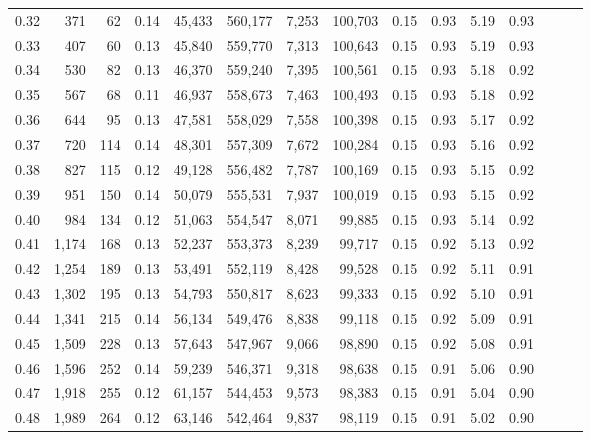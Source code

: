 \begin{tabular}{rrrrrrrrrrrrrrr}
0.32 &     371 &      62 &  0.14 &   45,433 &  560,177 &    7,253 &  100,703 &  0.15 &  0.93 &  5.19 &      0.93 \\
0.33 &     407 &      60 &  0.13 &   45,840 &  559,770 &    7,313 &  100,643 &  0.15 &  0.93 &  5.19 &      0.93 \\
0.34 &     530 &      82 &  0.13 &   46,370 &  559,240 &    7,395 &  100,561 &  0.15 &  0.93 &  5.18 &      0.92 \\
0.35 &     567 &      68 &  0.11 &   46,937 &  558,673 &    7,463 &  100,493 &  0.15 &  0.93 &  5.18 &      0.92 \\
0.36 &     644 &      95 &  0.13 &   47,581 &  558,029 &    7,558 &  100,398 &  0.15 &  0.93 &  5.17 &      0.92 \\
0.37 &     720 &     114 &  0.14 &   48,301 &  557,309 &    7,672 &  100,284 &  0.15 &  0.93 &  5.16 &      0.92 \\
0.38 &     827 &     115 &  0.12 &   49,128 &  556,482 &    7,787 &  100,169 &  0.15 &  0.93 &  5.15 &      0.92 \\
0.39 &     951 &     150 &  0.14 &   50,079 &  555,531 &    7,937 &  100,019 &  0.15 &  0.93 &  5.15 &      0.92 \\
0.40 &     984 &     134 &  0.12 &   51,063 &  554,547 &    8,071 &   99,885 &  0.15 &  0.93 &  5.14 &      0.92 \\
0.41 &   1,174 &     168 &  0.13 &   52,237 &  553,373 &    8,239 &   99,717 &  0.15 &  0.92 &  5.13 &      0.92 \\
0.42 &   1,254 &     189 &  0.13 &   53,491 &  552,119 &    8,428 &   99,528 &  0.15 &  0.92 &  5.11 &      0.91 \\
0.43 &   1,302 &     195 &  0.13 &   54,793 &  550,817 &    8,623 &   99,333 &  0.15 &  0.92 &  5.10 &      0.91 \\
0.44 &   1,341 &     215 &  0.14 &   56,134 &  549,476 &    8,838 &   99,118 &  0.15 &  0.92 &  5.09 &      0.91 \\
0.45 &   1,509 &     228 &  0.13 &   57,643 &  547,967 &    9,066 &   98,890 &  0.15 &  0.92 &  5.08 &      0.91 \\
0.46 &   1,596 &     252 &  0.14 &   59,239 &  546,371 &    9,318 &   98,638 &  0.15 &  0.91 &  5.06 &      0.90 \\
0.47 &   1,918 &     255 &  0.12 &   61,157 &  544,453 &    9,573 &   98,383 &  0.15 &  0.91 &  5.04 &      0.90 \\
0.48 &   1,989 &     264 &  0.12 &   63,146 &  542,464 &    9,837 &   98,119 &  0.15 &  0.91 &  5.02 &      0.90 \\

\end{tabular}
